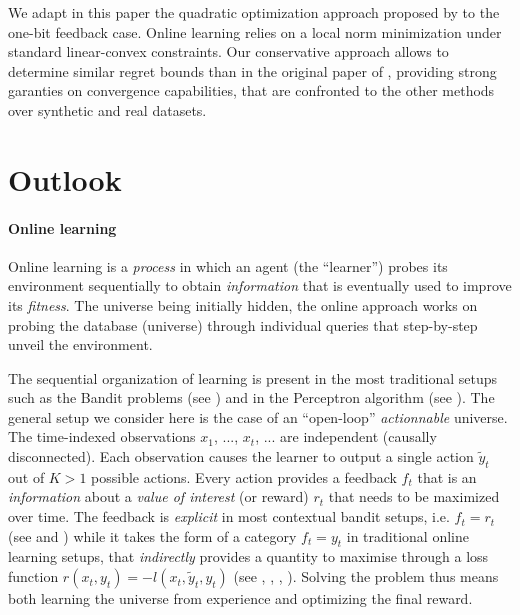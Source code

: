 \documentclass[preprint,12pt,authoryear]{elsarticle}
\begin{document}
We adapt in this paper the quadratic optimization approach proposed by \cite{crammer2006online} to the one-bit feedback case. Online learning relies on a local norm minimization under standard linear-convex constraints. Our conservative approach allows to determine similar regret bounds than in the original paper of \cite{crammer2006online}, providing strong garanties on  convergence capabilities, that are confronted to the other methods over synthetic and real datasets.  

\section{Outlook}

\paragraph{Online learning} Online learning is a \textit{process} in which an agent (the ``learner'') probes its environment sequentially to obtain \textit{information} that is eventually used to improve its \textit{fitness}.
The universe being initially hidden, the online approach works on probing the database (universe) through individual queries that step-by-step unveil the environment. 

The sequential organization of learning is present in the most traditional setups such as the Bandit problems (see \cite{robbins1952bandit}) and in the Perceptron algorithm (see \cite{rosenblatt1958perceptron}). The general setup we consider here is the case of an ``open-loop'' \textit{actionnable} universe. The time-indexed observations $x_1$, ..., $x_t$, ... are independent (causally disconnected). Each observation causes the learner to output a single action $\tilde{y}_t$ out of $K > 1$ possible actions. Every action provides a feedback $f_t$ that is an \textit{information} about a \textit{value of interest} (or reward) $r_t$ that needs to be maximized over time. The feedback is \textit{explicit} in most contextual bandit setups, i.e. $f_t=r_t$ (see \cite{lai1985asymptotically} and \cite{auer2002finite}) while it takes the form of a category $f_t=y_t$ in traditional online learning setups, that \textit{indirectly} provides a quantity to maximise through a loss function $r(x_t, y_t) = -l(x_t,\tilde{y}_t, y_t)$ (see  \cite{duda1973pattern}, \cite{freund1999large}, \cite{kivinen2004online}, \cite{crammer2006online}). Solving the problem thus means both  learning the universe from experience and optimizing the final reward. 
\end{document}
